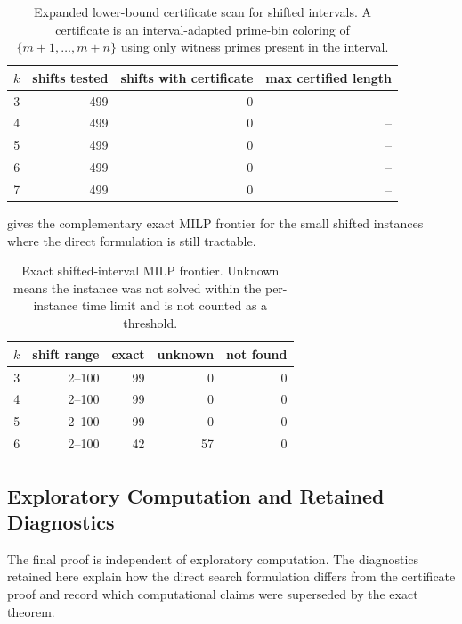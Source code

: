 \documentclass[11pt]{article}
\theoremstyle{plain}
\theoremstyle{definition}
\theoremstyle{remark}
\begin{document}
\begin{table}[htbp]
\centering
\caption{Expanded lower-bound certificate scan for shifted intervals.  A
certificate is an interval-adapted prime-bin coloring of
$\{m+1,\ldots,m+n\}$ using only witness primes present in the interval.}
\label{tab:shifted-lower-bound-summary}
\small
\begin{tabular}{@{}rrrr@{}}
\toprule
$k$ & shifts tested & shifts with certificate & max certified length \\
\midrule
3 & 499 & 0 & -- \\
4 & 499 & 0 & -- \\
5 & 499 & 0 & -- \\
6 & 499 & 0 & -- \\
7 & 499 & 0 & -- \\
\bottomrule
\end{tabular}

\end{table}

 gives the complementary exact MILP frontier
for the small shifted instances where the direct formulation is still
tractable.

\begin{table}[htbp]
\centering
\caption{Exact shifted-interval MILP frontier.  Unknown means the instance was
not solved within the per-instance time limit and is not counted as a
threshold.}
\label{tab:shifted-exact-summary}
\small
\begin{tabular}{@{}rrrrr@{}}
\toprule
$k$ & shift range & exact & unknown & not found \\
\midrule
3 & 2--100 & 99 & 0 & 0 \\
4 & 2--100 & 99 & 0 & 0 \\
5 & 2--100 & 99 & 0 & 0 \\
6 & 2--100 & 42 & 57 & 0 \\
\bottomrule
\end{tabular}

\end{table}

\subsection{Exploratory Computation and Retained Diagnostics}
\label{app:exploratory-lessons}

The final proof is independent of exploratory computation.  The diagnostics
retained here explain how the direct search formulation differs from the
certificate proof and record which computational claims were superseded by the
exact theorem.
\end{document}
